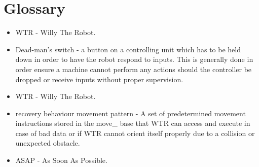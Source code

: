 \section{Glossary}
\begin{itemize}
\item \label{trm::WTR} WTR - Willy The Robot.
\item \label{trm::dms} Dead-man's switch - a button on a controlling unit which has to be held down in order to have the robot respond to inputs. This is generally done in order ensure a machine cannot perform any actions should the controller be dropped or receive inputs without proper supervision.
\item WTR - Willy The Robot.
\item \label{trm::recpat}recovery behaviour movement pattern - A set of predetermined movement instructions stored in the move\_ base that WTR can access and execute in case of bad data or if WTR cannot orient itself properly due to a collision or unexpected obstacle.
\item \label{trm::ASAP} ASAP - As Soon As Possible.
\end{itemize}